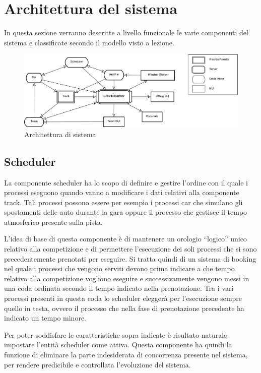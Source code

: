 \documentclass[11pt,a4paper]{report}
\begin{document}
\chapter{Architettura del sistema}
In questa sezione verranno descritte a livello funzionale le varie componenti del sistema e classificate secondo il modello visto a lezione.
\begin{landscape}
\begin{figure}
\includegraphics[height=.25\paperheight]{diagrammi/Arch}
\caption{Architettura di sistema}
\label{fig:architettura}
\end{figure}
\end{landscape}

\section{Scheduler}
La componente scheduler ha lo scopo di definire e gestire l'ordine con il quale i processi eseguono quando vanno a modificare i dati relativi alla componente track.
Tali processi possono essere per esempio i processi car che simulano gli spostamenti delle auto durante la gara oppure il processo che gestisce il tempo atmosferico
presente sulla pista.

L'idea di base di questa componente è di mantenere un orologio ``logico'' unico relativo alla competizione e di permettere l'esecuzione dei soli processi che si sono precedentemente prenotati per eseguire. Si tratta quindi di un sistema di booking nel quale i processi che vengono serviti devono prima indicare a che tempo relativo alla competizione vogliono eseguire e successivamente vengono messi in una coda ordinata secondo il tempo indicato nella prenotazione. Tra i vari processi presenti in questa coda lo scheduler eleggerà per l'esecuzione sempre quello in testa, ovvero il processo che nella fase di prenotazione precedente ha indicato un tempo minore.

Per poter soddisfare le caratteristiche sopra indicate è risultato naturale impostare l'entità scheduler come attiva.
Questa componente ha quindi la funzione di eliminare la parte indesiderata di concorrenza presente nel sistema, per rendere predicibile e controllata l'evoluzione del sistema.
\end{document}
